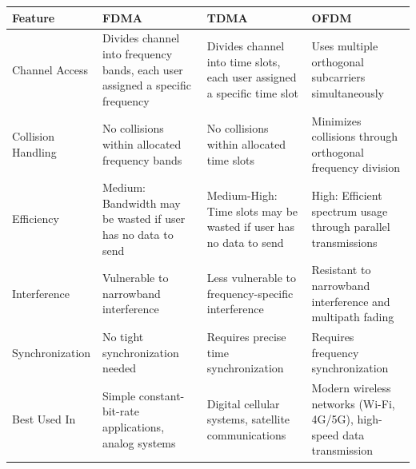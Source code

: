 \documentclass[a4paper, 9pt, landscape]{extarticle}
\begin{document}
\begin{tabular}{|p{2.5cm}|p{3.5cm}|p{3.5cm}|p{3.5cm}|}
  \hline
  \rowcolor[gray]{0.8}
  \textbf{Feature} & \textbf{FDMA} & \textbf{TDMA} & \textbf{OFDM} \\
  \hline
  Channel Access & Divides channel into frequency bands, each user assigned a specific frequency & Divides channel into time slots, each user assigned a specific time slot & Uses multiple orthogonal subcarriers simultaneously \\
  \hline
  Collision Handling & No collisions within allocated frequency bands & No collisions within allocated time slots & Minimizes collisions through orthogonal frequency division \\
  \hline
  Efficiency & Medium: Bandwidth may be wasted if user has no data to send & Medium-High: Time slots may be wasted if user has no data to send & High: Efficient spectrum usage through parallel transmissions \\
  \hline
  Interference & Vulnerable to narrowband interference & Less vulnerable to frequency-specific interference & Resistant to narrowband interference and multipath fading \\
  \hline
  Synchronization & No tight synchronization needed & Requires precise time synchronization & Requires frequency synchronization \\
  \hline
  Best Used In & Simple constant-bit-rate applications, analog systems & Digital cellular systems, satellite communications & Modern wireless networks (Wi-Fi, 4G/5G), high-speed data transmission \\
  \hline
  \end{tabular}
\end{document}
